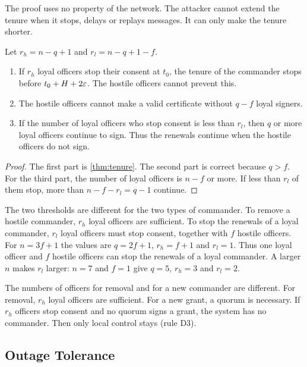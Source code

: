 The proof uses no property of the network. The attacker cannot extend the tenure when it
stops, delays or replays messages. It can only make the tenure shorter.

\begin{cor}
\label{cor:thresholds}
Let $r_h = n - q + 1$ and $r_l = n - q + 1 - f$.
\begin{enumerate}
  \item If $r_h$ loyal officers stop their consent at $t_0$, the tenure of the commander
  stops before $t_0 + H + 2\varepsilon$. The hostile officers cannot prevent this.
  \item The hostile officers cannot make a valid certificate without $q - f$ loyal signers.
  \item If the number of loyal officers who stop consent is less than $r_l$, then $q$ or
  more loyal officers continue to sign. Thus the renewals continue when the hostile
  officers do not sign.
\end{enumerate}
\end{cor}

\begin{proof}
The first part is \cref{thm:tenure}. The second part is correct because $q > f$. For the
third part, the number of loyal officers is $n - f$ or more. If less than $r_l$ of them
stop, more than $n - f - r_l = q - 1$ continue.
\end{proof}

The two thresholds are different for the two types of commander. To remove a hostile
commander, $r_h$ loyal officers are sufficient. To stop the renewals of a loyal commander,
$r_l$ loyal officers must stop consent, together with $f$ hostile officers. For $n = 3f + 1$
the values are $q = 2f + 1$, $r_h = f + 1$ and $r_l = 1$. Thus one loyal officer and $f$
hostile officers can stop the renewals of a loyal commander. A larger $n$ makes $r_l$
larger: $n = 7$ and $f = 1$ give $q = 5$, $r_h = 3$ and $r_l = 2$.

The numbers of officers for removal and for a new commander are different. For removal,
$r_h$ loyal officers are sufficient. For a new grant, a quorum is necessary. If $r_h$ officers stop
consent and no quorum signs a grant, the system has no commander. Then only local control
stays (rule D3).

\subsection{Outage Tolerance}

